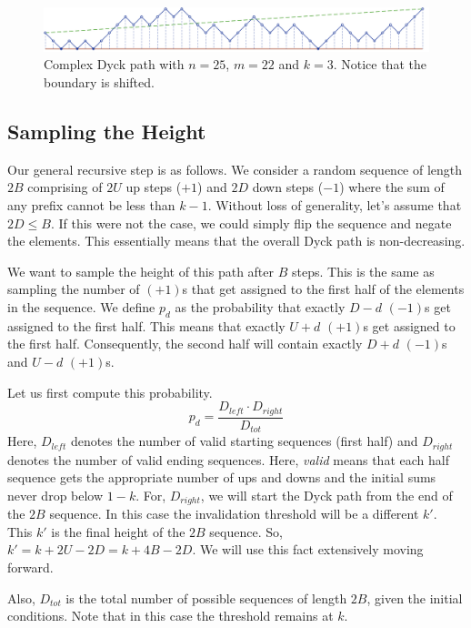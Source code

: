 \begin{figure}[htbp]
    \centering
    \includegraphics[width=\textwidth]{images/complex_dyck_path.pdf}
    \caption{Complex Dyck path with $n = 25$, $m = 22$ and $k = 3$.
             Notice that the boundary is shifted.} \label{fig:complex_dyck}
\end{figure}

\subsection{Sampling the Height}
Our general recursive step is as follows.
We consider a random sequence of length $2B$ comprising of $2U$ up steps ($+1$) and $2D$ down steps ($-1$)
where the sum of any prefix cannot be less than $k-1$.
Without loss of generality, let's assume that $2D\le B$. If this were not the case, we could simply flip the sequence and negate the elements.
This essentially means that the overall Dyck path is non-decreasing.

We want to sample the height of this path after $B$ steps.
This is the same as sampling the number of $(+1)$s that get assigned to the first half of the elements in the sequence.
We define $p_d$ as the probability that exactly $D-d$ $(-1)$s get assigned to the first half.
This means that exactly $U+d$ $(+1)$s get assigned to the first half.
Consequently, the second half will contain exactly $D+d$ $(-1)$s and $U-d$ $(+1)$s.


Let us first compute this probability.
$$
p_d = \frac{D_{left}\cdot D_{right}}{D_{tot}}
$$
Here, $D_{left}$ denotes the number of valid starting sequences (first half)
and $D_{right}$ denotes the number of valid ending sequences.
Here, \textit{valid} means that each half sequence gets the appropriate number of ups and downs
and the initial sums never drop below $1-k$.
For, $D_{right}$, we will start the Dyck path from the end of the $2B$ sequence.
In this case the invalidation threshold will be a different $k'$.
This $k'$ is the final height of the $2B$ sequence. So, $k'=k+2U-2D = k+4B-2D$.
We will use this fact extensively moving forward.

Also, $D_{tot}$ is the total number of possible sequences of length $2B$, given the initial conditions.
Note that in this case the threshold remains at $k$.

